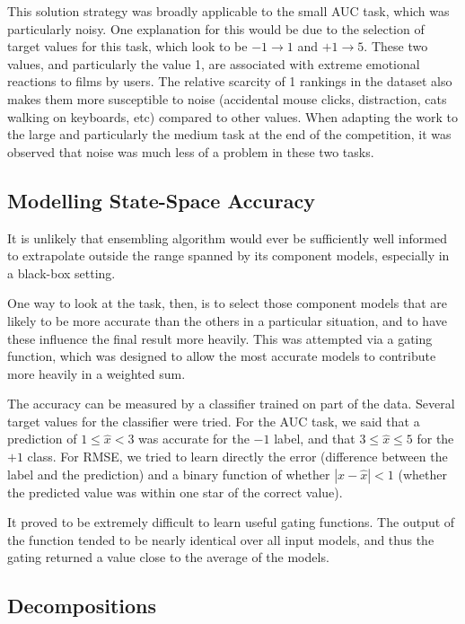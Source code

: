 \documentclass{article}
\begin{document}
This solution strategy was broadly applicable to the small AUC task, which was particularly noisy.
One explanation for this would be due to the selection of target values for this task, which look to be $-1 \rightarrow 1$ and $+1 \rightarrow 5$.  
These two values, and particularly the value 1, are associated with extreme emotional reactions to films by users.  
The relative scarcity of 1 rankings in the dataset also makes them more susceptible to noise (accidental mouse clicks, distraction, cats walking on keyboards, etc) compared to other values.
When adapting the work to the large and particularly the medium task at the end of the competition, it was observed that noise was much less of a problem in these two tasks.

\subsection{Modelling State-Space Accuracy}

It is unlikely that ensembling algorithm would ever be sufficiently well informed to extrapolate outside the range spanned by its component models, especially in a black-box setting.

One way to look at the task, then, is to select those component models that are likely to be more accurate than the others in a particular situation, and to have these influence the final result more heavily.  This was attempted via a gating function, which was designed to allow the most accurate models to contribute more heavily in a weighted sum.

The accuracy can be measured by a classifier trained on part of the data.  Several target values for the classifier were tried.  For the AUC task, we said that a prediction of $1 \leq \hat{x} < 3$ was accurate for the $-1$ label, and that $3 \leq \hat{x} \leq 5$ for the $+1$ class.  For RMSE, we tried to learn directly the error (difference between the label and the prediction) and a binary function of whether $|x - \hat{x}| < 1$ (whether the predicted value was within one star of the correct value).

It proved to be extremely difficult to learn useful gating functions.  The output of the function tended to be nearly identical over all input models, and thus the gating returned a value close to the average of the models.

\subsection{Decompositions}
\end{document}
